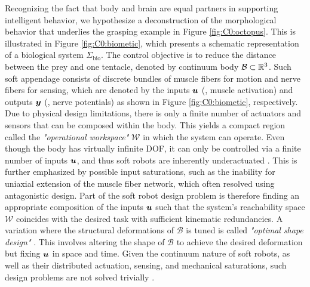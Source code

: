 Recognizing the fact that body and brain are equal partners in supporting intelligent behavior, we hypothesize a deconstruction of the morphological behavior that underlies the grasping example in Figure \ref{fig:C0:octopus}. This is illustrated in Figure \ref{fig:C0:biometic}, which presents a schematic representation of a biological system $\Sigma_{\textrm{bio}}$. The control objective is to reduce the distance between the prey and one tentacle, denoted by continuum body $\mathcal{B} \subset \mathbb{R}^3$. Such soft appendage consists of discrete bundles of muscle fibers for motion and nerve fibers for sensing, which are denoted by the inputs ${\boldsymbol{u}}$ (\eg, muscle activation) and outputs ${\boldsymbol{y}}$ (\eg, nerve potentials) as shown in Figure \ref{fig:C0:biometic}, respectively. Due to physical design limitations, there is only a finite number of actuators and sensors that can be composed within the body. This yields a compact region called the \textit{"operational workspace"} $\mathcal{W}$ \cite{Spong1996,Murray1994,Ortega1998} in which the system can operate. Even though the body has virtually infinite DOF, it can only be controlled via a finite number of inputs ${\boldsymbol{u}}$, and thus soft robots are inherently underactuated \cite{Spong1996a,Russ2022}. This is further emphasized by possible input saturations, such as the inability for uniaxial extension of the muscle fiber network, which often resolved using antagonistic design. Part of the soft robot design problem is therefore finding an appropriate composition of the inputs ${\boldsymbol{u}}$ such that the system's reachability space $\mathcal{W}$ coincides with the desired task with sufficient kinematic redundancies. A variation where the structural deformations of $\mathcal{B}$ is tuned is called \textit{"optimal shape design"} \cite{Bendsoe2003}. This involves altering the shape of $\mathcal{B}$ to achieve the desired deformation but fixing ${\boldsymbol{u}}$ in space and time. Given the continuum nature of soft robots, as well as their distributed actuation, sensing, and mechanical saturations, such design problems are not solved trivially \cite{Xavier2022Jun,Bern2019,Coevoet2017Feb,Tian2020May,Smith2022}.


